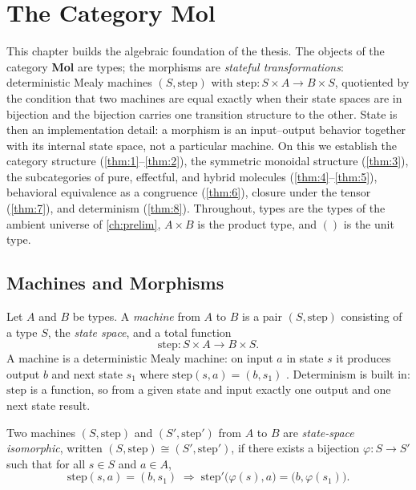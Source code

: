 \chapter{The Category Mol}\label{ch:mol}

This chapter builds the algebraic foundation of the thesis. The objects of the
category \textbf{Mol} are types; the morphisms are \emph{stateful
transformations}: deterministic Mealy machines
$(S, \mathrm{step})$ with $\mathrm{step} : S \times A \to B \times S$,
quotiented by the condition that two machines are equal exactly when their
state spaces are in bijection and the bijection carries one transition
structure to the other. State is then an implementation detail: a morphism is
an input--output behavior together with its internal state space, not a
particular machine. On this we establish the category structure (\autoref{thm:1}--\autoref{thm:2}),
the symmetric monoidal structure (\autoref{thm:3}), the subcategories of pure, effectful,
and hybrid molecules (\autoref{thm:4}--\autoref{thm:5}), behavioral equivalence as a congruence (\autoref{thm:6}),
closure under the tensor (\autoref{thm:7}), and determinism (\autoref{thm:8}). Throughout, types are
the types of the ambient universe of \autoref{ch:prelim}, $A \times B$ is the
product type, and $()$ is the unit type.

\section{Machines and Morphisms}\label{sec:mol-machines}

\begin{definition}[Machine]\label{def:machine}
Let $A$ and $B$ be types. A \emph{machine} from $A$ to $B$ is a pair
$(S, \mathrm{step})$ consisting of a type $S$, the \emph{state space}, and a
total function
\[ \mathrm{step} : S \times A \to B \times S . \]
A machine is a deterministic Mealy machine: on input $a$ in state $s$ it
produces output $b$ and next state $s_1$ where
$\mathrm{step} (s, a) = (b, s_1)$ \citep{mealy, moore}. Determinism is built
in: $\mathrm{step}$ is a function, so from a given state and input exactly one
output and one next state result.
\end{definition}

\begin{definition}\label{def:stiso}
Two machines $(S, \mathrm{step})$ and $(S', \mathrm{step}')$ from $A$ to $B$
are \emph{state-space isomorphic}, written
$(S, \mathrm{step}) \cong (S', \mathrm{step}')$, if there exists a bijection
$\varphi : S \to S'$ such that for all $s \in S$ and $a \in A$,
\[ \mathrm{step} (s, a) = (b, s_1) \;\Longrightarrow\;
   \mathrm{step}'\bigl (\varphi (s), a\bigr) = \bigl (b, \varphi (s_1)\bigr) . \]
\end{definition}

